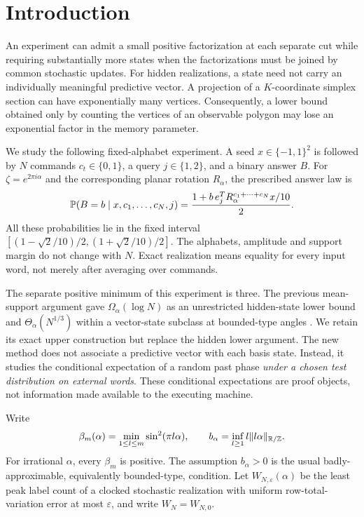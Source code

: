 \section{Introduction}
An experiment can admit a small positive factorization at each separate
cut while requiring substantially more states when the factorizations must
be joined by common stochastic updates. For hidden realizations, a state
need not carry an individually meaningful predictive vector. A projection
of a $K$-coordinate simplex section can have exponentially many vertices.
Consequently, a lower bound obtained only by counting the vertices of an
observable polygon may lose an exponential factor in the memory parameter.

We study the following fixed-alphabet experiment. A seed
$x\in\{-1,1\}^2$ is followed by $N$ commands $c_t\in\{0,1\}$,
a query $j\in\{1,2\}$, and a binary answer $B$. For
$\zeta=e^{2\pi i\alpha}$ and the corresponding planar rotation $R_\alpha$,
the prescribed answer law is
\begin{equation}\label{eq:array34}
 \mathbb P(B=b\mid x,c_1,\ldots,c_N,j)
   =\frac{1+b\,e_j^TR_\alpha^{c_1+\cdots+c_N}x/10}{2}.
\end{equation}
All these probabilities lie in the fixed interval
$[(1-\sqrt2/10)/2,(1+\sqrt2/10)/2]$. The alphabets, amplitude and
support margin do not change with $N$. Exact realization means equality
for every input word, not merely after averaging over commands.

The separate positive minimum of this experiment is three. The previous
mean-support argument gave $\Omega_\alpha(\log N)$ as an unrestricted
hidden-state lower bound and $\Theta_\alpha(N^{1/3})$ within a vector-state
subclass at bounded-type angles \cite{GTF33}. We retain its exact upper
construction but replace the hidden lower argument. The new method does
not associate a predictive vector with each basis state. Instead, it
studies the conditional expectation of a random past phase \emph{under a
chosen test distribution on external words}. These conditional expectations
are proof objects, not information made available to the executing machine.

Write
\begin{equation}\label{eq:beta34}
 \beta_m(\alpha)=\min_{1\le l\le m}\sin^2(\pi l\alpha),\qquad
 b_\alpha=\inf_{l\ge1}l\|l\alpha\|_{\mathbb R/\mathbb Z}.
\end{equation}
For irrational $\alpha$, every $\beta_m$ is positive. The assumption
$b_\alpha>0$ is the usual badly-approximable, equivalently bounded-type,
condition. Let $W_{N,\varepsilon}(\alpha)$ be the least peak label count
of a clocked stochastic realization with uniform row-total-variation error
at most $\varepsilon$, and write $W_N=W_{N,0}$.

